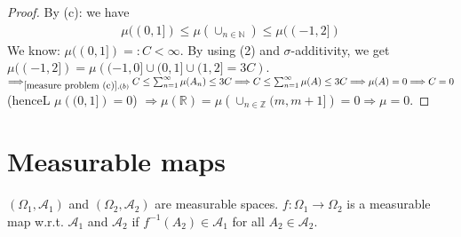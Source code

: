 \documentclass[../../note.tex]{subfiles}
\begin{document}
\begin{proof}
    By (c): 
    we have 
    \begin{align}
        \label{measure problem (c)}
        \mu((0,1]) \leq \mu(\cup_{n \in \mathbb{N}}) \leq \mu((-1,2])
    \end{align}
    We know: $\mu((0,1]) =: C < \infty $. By using (2) and $\sigma$-additivity, we get $\mu((-1,2]) = \mu\left((-1,0] \cup (0,1] \cup (1,2] = 3 C\right)$. $\Longrightarrow_{\ref{measure problem (c)}, (b)} C \leq \sum_{n=1}^{\infty} \mu(A_n) \leq 3 C \Longrightarrow C \leq \sum_{n=1}^{\infty} \mu(A) \leq 3 C \Longrightarrow \mu(A) = 0 \Longrightarrow C=0$(henceL $\mu\left((0,1]\right)=0$) $\Longrightarrow \mu(\mathbb{R}) = \mu\left(\cup_{n \in \mathbb{Z}}(m,m+1]\right) = 0 \Longrightarrow \mu = 0$. 
\end{proof}

\section{Measurable maps}
\begin{definition}
    $(\Omega_1, \mathcal{A}_1)$ and $(\Omega_2, \mathcal{A}_2)$ are measurable spaces. $f: \Omega_1 \rightarrow \Omega_2$ is a measurable map w.r.t. $\mathcal{A}_1$ and $\mathcal{A}_2$  if $f^{-1}(A_2) \in \mathcal{A}_1$ for all $A_2 \in \mathcal{A}_2$.
\end{definition}
\end{document}
